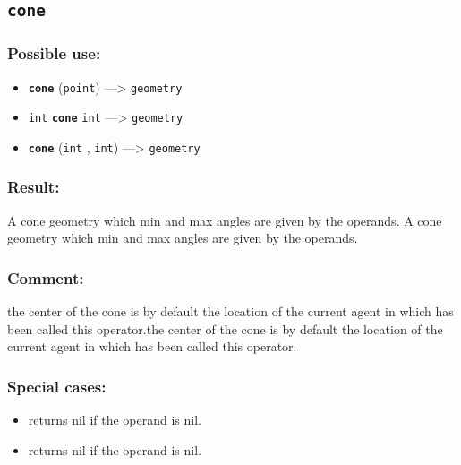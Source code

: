 \documentclass[]{book}
\providecommand{\tightlist}{%
  \setlength{\itemsep}{0pt}\setlength{\parskip}{0pt}}
\theoremstyle{definition}
\theoremstyle{definition}
\theoremstyle{definition}
\theoremstyle{remark}
\begin{document}
\subsection{\texorpdfstring{\texttt{cone}}{cone}}\label{cone}

\subsubsection{Possible use:}\label{possible-use-94}

\begin{itemize}
\tightlist
\item
  \textbf{\texttt{cone}} (\texttt{point}) ---\textgreater{}
  \texttt{geometry}
\item
  \texttt{int} \textbf{\texttt{cone}} \texttt{int} ---\textgreater{}
  \texttt{geometry}
\item
  \textbf{\texttt{cone}} (\texttt{int} , \texttt{int}) ---\textgreater{}
  \texttt{geometry}
\end{itemize}

\subsubsection{Result:}\label{result-92}

A cone geometry which min and max angles are given by the operands. A
cone geometry which min and max angles are given by the operands.

\subsubsection{Comment:}\label{comment-22}

the center of the cone is by default the location of the current agent
in which has been called this operator.the center of the cone is by
default the location of the current agent in which has been called this
operator.

\subsubsection{Special cases:}\label{special-cases-30}

\begin{itemize}
\tightlist
\item
  returns nil if the operand is nil.\\
\item
  returns nil if the operand is nil.
\end{itemize}
\end{document}
